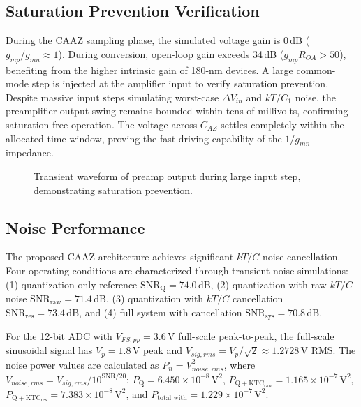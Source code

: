 \documentclass[journal]{IEEEtran}
\begin{document}
\subsection{Saturation Prevention Verification}
During the CAAZ sampling phase, the simulated voltage gain is 0\,dB ($g_{mp}/g_{mn} \approx 1$). During conversion, open-loop gain exceeds 34\,dB ($g_{mp}R_{OA} > 50$), benefiting from the higher intrinsic gain of 180-nm devices. A large common-mode step is injected at the amplifier input to verify saturation prevention. Despite massive input steps simulating worst-case $\Delta V_{in}$ and $kT/C_1$ noise, the preamplifier output swing remains bounded within tens of millivolts, confirming saturation-free operation. The voltage across $C_{AZ}$ settles completely within the allocated time window, proving the fast-driving capability of the $1/g_{mn}$ impedance.

\begin{figure}[!t]
\centering
{}
\caption{Transient waveform of preamp output during large input step, demonstrating saturation prevention.}
\label{fig:transient}
\end{figure}

\subsection{Noise Performance}
The proposed CAAZ architecture achieves significant $kT/C$ noise cancellation. Four operating conditions are characterized through transient noise simulations: (1) quantization-only reference $\mathrm{SNR_Q} = 74.0\,\mathrm{dB}$, (2) quantization with raw $kT/C$ noise $\mathrm{SNR_{raw}} = 71.4\,\mathrm{dB}$, (3) quantization with $kT/C$ cancellation $\mathrm{SNR_{res}} = 73.4\,\mathrm{dB}$, and (4) full system with cancellation $\mathrm{SNR_{sys}} = 70.8\,\mathrm{dB}$.

For the 12-bit ADC with $V_{FS,pp}=3.6\,\mathrm{V}$ full-scale peak-to-peak, the full-scale sinusoidal signal has $V_p=1.8\,\mathrm{V}$ peak and $V_{sig,rms}=V_p/\sqrt{2}\approx 1.2728\,\mathrm{V}$ RMS. The noise power values are calculated as $P_n = V_{noise,rms}^2$, where $V_{noise,rms}=V_{sig,rms}/10^{\mathrm{SNR}/20}$: 
$P_\mathrm{Q} = 6.450\times 10^{-8}\,\mathrm{V^2}$, 
$P_\mathrm{Q+KTC_{raw}} = 1.165\times 10^{-7}\,\mathrm{V^2}$, 
$P_\mathrm{Q+KTC_{res}} = 7.383\times 10^{-8}\,\mathrm{V^2}$, 
and $P_\mathrm{total\_with} = 1.229\times 10^{-7}\,\mathrm{V^2}$.
\end{document}
